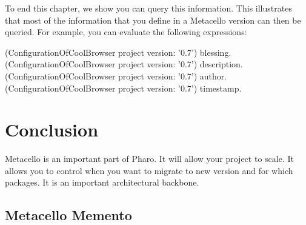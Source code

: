 \documentclass[a4paper,10pt,twoside]{book}
\begin{document}
To end this chapter, we show you can query this information. This illustrates that most of the information that you define in a Metacello version can then be queried. For example, you can evaluate the following expressions:

\begin{code}{}
(ConfigurationOfCoolBrowser project version: '0.7') blessing.
(ConfigurationOfCoolBrowser project version: '0.7') description.
(ConfigurationOfCoolBrowser project version: '0.7') author.
(ConfigurationOfCoolBrowser project version: '0.7') timestamp.
\end{code}


\section{Conclusion}
Metacello is an important part of Pharo. It will allow your project to scale. It allows you to control when you want to migrate to new version and for which packages. It is an important architectural backbone.

\subsection{Metacello Memento}
\end{document}
